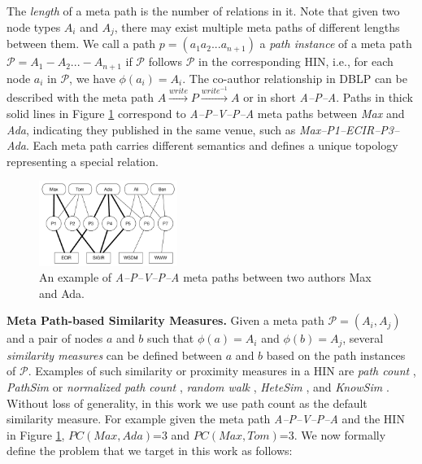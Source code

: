 The \textit{length} of a meta path is the number of relations in it. Note that given two node types $A_i$ and $A_j$, there may exist multiple meta paths of different lengths between them. We call a path $p = (a_1a_2...a_{n+1})$ a \textit{path instance} of a meta path $\mathcal{P} = A_1-A_2... -A_{n+1}$ if $\mathcal{P}$ follows $\mathcal{P}$ in the corresponding HIN, i.e., for each node $a_i$ in $\mathcal{P}$, we have $\phi(a_i)=A_i$. The co-author relationship in DBLP can be described with the meta path $A\xrightarrow{write}P\xrightarrow{write^{-1}}A$ or in short \textit{A--P--A}. Paths in thick solid lines in Figure \ref{sampleNetwork} correspond to \textit{A--P--V--P--A} meta paths between \textit{Max} and \textit{Ada}, indicating they published in the same venue, such as \textit{Max--P1--ECIR--P3--Ada}. Each meta path carries different semantics and defines a unique topology representing a special relation. %

\begin{figure}[t]
\centering
\includegraphics[width=0.4\textwidth]{figs/exampleSocialNetwork.pdf}
\caption{An example of \textit{A--P--V--P--A} meta paths between two authors Max and Ada.}
\label{sampleNetwork}
\end{figure}


\textbf{Meta Path-based Similarity Measures.} Given a meta path $\mathcal{P} = (A_i,A_j)$ and a pair of nodes $a$ and $b$ such that $\phi(a)=A_i$ and $\phi(b)=A_{j}$, several \textit{similarity measures} can be defined between $a$ and $b$ based on the path instances of $\mathcal{P}$. Examples of such similarity or proximity measures in a HIN are \textit{path count} \cite{sun2011pathsim,sun2011ASONAM}, \textit{PathSim} \cite{sun2011pathsim} or \textit{normalized path count} \cite{sun2011ASONAM}, \textit{random walk} \cite{sun2011ASONAM}, \textit{HeteSim} \cite{shi2014hetesim}, and \textit{KnowSim} \cite{wang2016text}. 
Without loss of generality, in this work we use path count as the default similarity measure. For example given the meta path \textit{A--P--V--P--A} and the HIN in Figure \ref{sampleNetwork}, $PC(Max,Ada)$=3 and $PC(Max,Tom)$=3. We now formally define the problem that we target in this work as follows:

